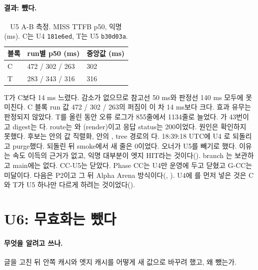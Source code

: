 \paragraph{결과: 뺐다.}
\begin{table}[H]
  \caption{U5 A-B 측정. MISS TTFB p50, 익명 (ms). C는 U4 \texttt{181e6ed}, T는 U5 \texttt{b30d03a}.}
  \label{tab:cc3-u5-ab}
  \centering\small
  \begin{tabularx}{\linewidth}{@{}L{1.2cm} L{3.6cm} Y@{}}
    \toprule
    블록 & run별 p50 (ms) & 중앙값 (ms) \\
    \midrule
    C & 472 / 302 / 263 & 302 \\
    \midrule
    T & 283 / 343 / 316 & 316 \\
    \bottomrule
  \end{tabularx}
\end{table}
T가 C보다 14 ms 느렸다. 감소가 없으므로 참고선 50 ms와 판정선 140 ms 모두에 못 미친다.
C 블록 run 값 472 / 302 / 263의 퍼짐이 이 차 14 ms보다 크다. 효과 유무는 판정되지 않았다.
T를 올린 동안  오류 로그가 855줄에서 1134줄로 늘었다.
가 43번이고 digest는 다.
route는 와 (render)이고 응답 status는 200이었다.
원인은 확인하지 못했다. 후보는  안의 값 직렬화,  안의 , tree 경로의 다.
18:39:18 UTC에 U4 로 되돌리고 purge했다. 되돌린 뒤 smoke에서 새 줄은 0이었다.
오너가 U5를 빼기로 했다. 이유는 속도 이득의 근거가 없고, 익명 대부분이 엣지 HIT라는 것이다().
branch 는 보관하고 main에는 없다. CC-U5는 닫았다.
Phase CC는 U4만 운영에 두고 닫혔고 G-CC는 미달이다. 다음은 P2이고 그 뒤 Alpha Arena 방식이다(, ).
U4에 를 먼저 넣은 것은 C와 T가 U5 하나만 다르게 하려는 것이었다().

\section{U6: 무효화는 뺐다}\label{sec:cc3-u6}

\paragraph{무엇을 알려고 쓰나.}
글을 고친 뒤 안쪽 캐시와 엣지 캐시를 어떻게 새 값으로 바꾸려 했고, 왜 뺐는가.

